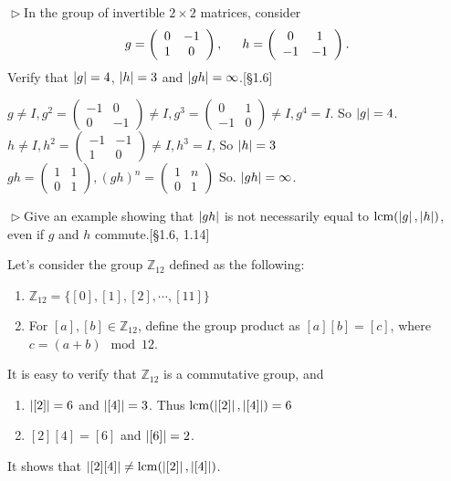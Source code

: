 \begin{problem}[1.12]
$\vartriangleright$In the group of invertible $2\times 2$ matrices, consider
$$g=\left(\begin{array}{cc} 0 & -1 \\ 1 & 0 \end{array} \right), \indent h=\left(\begin{array}{cc} 0 & 1 \\ -1 & -1 \end{array} \right).$$
Verify that $\left|g\right|=4$, $\left|h\right|=3$ and $\left|gh\right|=\infty$.[\S 1.6]
\end{problem}

\begin{solution}
$g \neq I, g^2=\left(\begin{array}{cc} -1 & 0 \\ 0 & -1 \end{array} \right)\neq I, 
g^3=\left(\begin{array}{cc} 0 & 1 \\ -1 & 0 \end{array} \right)\neq I, g^4 = I$.
So $\left|g\right|=4$.\\
$h\neq I, h^2=\left(\begin{array}{cc} -1 & -1 \\ 1 & 0 \end{array} \right)\neq I, h^3 = I$, So $\left|h\right| = 3$\\
$gh=\left(\begin{array}{cc} 1 & 1 \\ 0 & 1 \end{array} \right), (gh)^n = \left(\begin{array}{cc} 1 & n \\ 0 & 1 \end{array} \right)$
So. $\left|gh\right| = \infty$.
\end{solution}

\begin{problem}[1.13]
$\vartriangleright$Give an example showing that $\left|gh\right|$ is not necessarily equal to $\operatorname{lcm}(\left|g\right|,\left|h\right|)$, even if $g$ and $h$
commute.[\S 1.6, 1.14]
\end{problem}

\begin{solution}
Let's consider the group $\mathbb{Z}_{12}$ defined as the following:
\begin{enumerate}
\item $\mathbb{Z}_{12} = \{[0], [1], [2],\cdots, [11]\}$
\item For $[a], [b]\in \mathbb{Z}_{12}$, define the group product as $[a][b] = [c]$, where $c= (a+b) \mod 12$.
\end{enumerate}
It is easy to verify that $\mathbb{Z}_{12}$ is a commutative group, and 
\begin{enumerate}
\item $\left|[2]\right| = 6$ and $\left|[4]\right| = 3$. Thus $\operatorname{lcm}(\left|[2]\right|, \left|[4]\right|) = 6$
\item $[2][4]=[6]$ and $\left|[6]\right| = 2$.
\end{enumerate}
It shows that $\left|[2][4]\right| \neq \operatorname{lcm}(\left|[2]\right|, \left|[4]\right|)$.
\end{solution}


